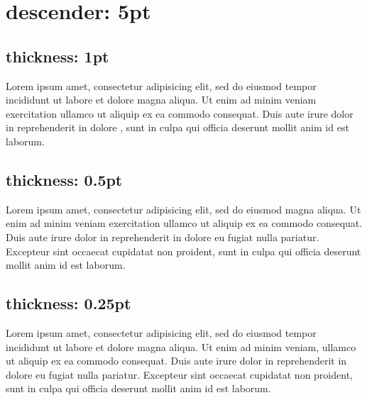 \documentclass{article}
\begin{document}
\section{descender: 5pt}

\subsection{thickness: 1pt}


Lorem ipsum  amet, consectetur adipisicing elit, sed
do eiusmod tempor incididunt ut labore et dolore magna aliqua. Ut enim
ad minim veniam exercitation ullamco  ut aliquip ex
ea commodo consequat. Duis aute irure dolor in reprehenderit in
 dolore , sunt in culpa
qui officia deserunt mollit anim id est laborum.

\subsection{thickness: 0.5pt}


Lorem ipsum  amet, consectetur adipisicing elit, sed
do eiusmod  magna aliqua.
Ut enim ad minim veniam exercitation ullamco  ut
aliquip ex ea commodo consequat. Duis aute irure dolor in reprehenderit
in  dolore eu fugiat nulla pariatur.
Excepteur sint occaecat cupidatat non proident, sunt in culpa qui
officia deserunt mollit anim id est laborum.

\subsection{thickness: 0.25pt}


Lorem ipsum  amet, consectetur adipisicing elit, sed
do eiusmod tempor incididunt ut labore et dolore magna aliqua. Ut enim
ad minim veniam, ullamco  ut aliquip
ex ea commodo consequat. Duis aute irure dolor in reprehenderit in
 dolore eu fugiat nulla pariatur.
Excepteur sint occaecat cupidatat non proident, sunt in culpa qui
officia deserunt mollit anim id est laborum.
\end{document}
